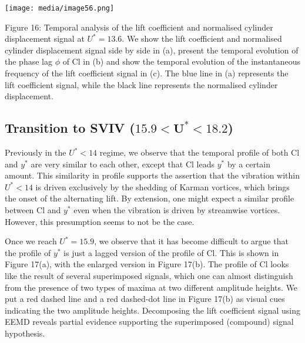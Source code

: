\documentclass[]{article}
\begin{document}
\texttt{[image: media/image56.png]}

\protect\hypertarget{_Ref41047456}{}{\protect\hypertarget{_Toc41048839}{}{}}Figure
16: Temporal analysis of the lift coefficient and normalised cylinder
displacement signal at \(U^{*} = 13.6\). We show the lift coefficient
and normalised cylinder displacement signal side by side in (a), present
the temporal evolution of the phase lag \(\phi\) of Cl in (b) and show
the temporal evolution of the instantaneous frequency of the lift
coefficient signal in (c). The blue line in (a) represents the lift
coefficient signal, while the black line represents the normalised
cylinder displacement.

\subsection{\texorpdfstring{\protect\hypertarget{_Ref24287997}{}{\protect\hypertarget{_Toc41048814}{}{}}Transition
to SVIV
(\(\mathbf{15.9 <}\mathbf{U}^{\mathbf{*}}\mathbf{< 18.2}\))}{Transition to SVIV (\textbackslash{}mathbf\{15.9 \textless{}\}\textbackslash{}mathbf\{U\}\^{}\{\textbackslash{}mathbf\{*\}\}\textbackslash{}mathbf\{\textless{} 18.2\})}}\label{transition-to-sviv-mathbf15.9-mathbfumathbfmathbf-18.2}

Previously in the \(U^{*} < 14\) regime, we observe that the temporal
profile of both Cl and \(y^{*}\) are very similar to each other, except
that Cl leads \(y^{*}\) by a certain amount. This similarity in profile
supports the assertion that the vibration within \(U^{*} < 14\) is
driven exclusively by the shedding of Karman vortices, which brings the
onset of the alternating lift. By extension, one might expect a similar
profile between Cl and \(y^{*}\) even when the vibration is driven by
streamwise vortices. However, this presumption seems to not be the case.

Once we reach \(U^{*} = 15.9\), we observe that it has become difficult
to argue that the profile of \(y^{*}\) is just a lagged version of the
profile of Cl. This is shown in Figure 17(a), with the enlarged version
in Figure 17(b). The profile of Cl looks like the result of several
superimposed signals, which one can almost distinguish from the presence
of two types of maxima at two different amplitude heights. We put a red
dashed line and a red dashed-dot line in Figure 17(b) as visual cues
indicating the two amplitude heights. Decomposing the lift coefficient
signal using EEMD reveals partial evidence supporting the superimposed
(compound) signal hypothesis.
\end{document}
